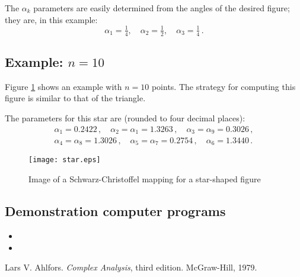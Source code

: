 \documentclass[12pt]{article}
\begin{document}
The $\alpha_k$ parameters are easily determined from the angles
of the desired figure; they are, in this example:
\[
\alpha_1 = \tfrac14, \quad \alpha_2 = \tfrac12, \quad \alpha_3 = \tfrac14\,.
\]


\subsection{Example: $n=10$}

Figure \ref{fig:star}
shows an example with $n=10$ points.
The strategy for computing this figure is similar to that
of the triangle.

The parameters for this star are (rounded to four decimal places):
\begin{align*}
\alpha_1 = 0.2422 \,,  \quad \alpha_2 = \alpha_1 = 1.3263\,,  \quad \alpha_3 = \alpha_9 = 0.3026 \,, \\
\alpha_4 = \alpha_8 = 1.3026 \,,  \quad \alpha_5 = \alpha_7 = 0.2754\,,  \quad \alpha_6 = 1.3440 \,.
\end{align*}

\begin{figure}
\begin{center}
\texttt{[image: star.eps]}
\end{center}
\caption{Image of a Schwarz-Christoffel mapping for a star-shaped figure}
\label{fig:star}
\end{figure}

\subsection{Demonstration computer programs}

\begin{itemize}
\item
{}
\item
{}
\end{itemize}

\begin{thebibliography}{3}
Lars V. Ahlfors. {\it Complex Analysis}, third edition. McGraw-Hill, 1979.
\end{thebibliography}

\end{document}
